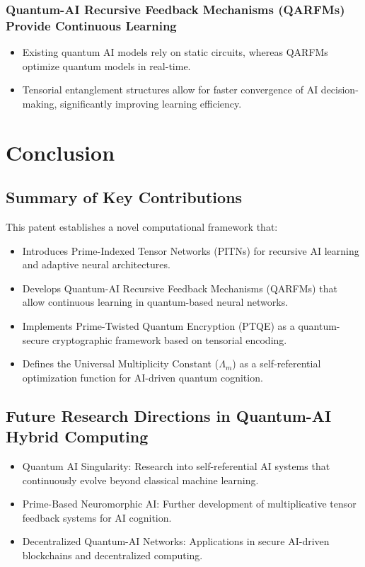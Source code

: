 \documentclass{article}
\theoremstyle{plain}
\begin{document}
\subsubsection{Quantum-AI Recursive Feedback Mechanisms (QARFMs) Provide Continuous Learning}
\begin{itemize}
    \item Existing quantum AI models rely on static circuits, whereas QARFMs optimize quantum models in real-time.
    \item Tensorial entanglement structures allow for faster convergence of AI decision-making, significantly improving learning efficiency.
\end{itemize}

\section{Conclusion}

\subsection{Summary of Key Contributions}
This patent establishes a novel computational framework that:
\begin{itemize}
    \item Introduces Prime-Indexed Tensor Networks (PITNs) for recursive AI learning and adaptive neural architectures.
    \item Develops Quantum-AI Recursive Feedback Mechanisms (QARFMs) that allow continuous learning in quantum-based neural networks.
    \item Implements Prime-Twisted Quantum Encryption (PTQE) as a quantum-secure cryptographic framework based on tensorial encoding.
    \item Defines the Universal Multiplicity Constant ($\Lambda_m$) as a self-referential optimization function for AI-driven quantum cognition.
\end{itemize}

\subsection{Future Research Directions in Quantum-AI Hybrid Computing}
\begin{itemize}
    \item Quantum AI Singularity: Research into self-referential AI systems that continuously evolve beyond classical machine learning.
    \item Prime-Based Neuromorphic AI: Further development of multiplicative tensor feedback systems for AI cognition.
    \item Decentralized Quantum-AI Networks: Applications in secure AI-driven blockchains and decentralized computing.
\end{itemize}
\end{document}
